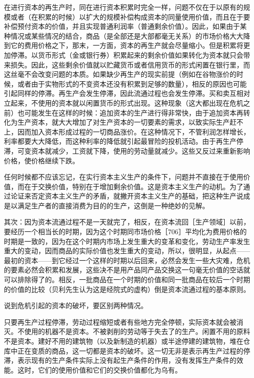 在进行资本的再生产时，同在进行资本积累时完全一样，问题不仅在于以原有的规模或者（在积累的时候）以扩大的规模补偿构成资本的同量使用价值，而且在于要补偿预付资本的价值，并且实现普通利润率（普通剩余价值）。因此，如果由于某种情况或某些情况的结合，商品（是全部还是大部都毫无关系）的市场价格大大降到它的费用价格之下，那末，一方面，资本的再生产就会尽量缩小。但是积累将更加停滞。以货币形式（金或银行券）积累起来的剩余价值如果转化为资本就只会带来损失。因此，这些剩余价值就以贮藏货币或者信用货币的形式闲置在银行里，而这丝毫不会改变问题的本质。如果缺少再生产的现实前提（例如在谷物涨价的时候，或者由于实物形式的不变资本还没有积累到足够的数量），相反的原因也可能引起同样的停滞。再生产会发生停滞，因此流通过程也会发生停滞。买和卖互相对立起来，不使用的资本就以闲置货币的形式出现。这种现象（这大都出现在危机之前）也可能发生在这样的时候：追加资本的生产进行得非常快，由于追加资本再转化为生产资本，就大大增加了对生产资本的一切要素的需求，以致实际生产赶不上，因而加入资本形成过程的一切商品涨价。在这种情况下，不管利润怎样增长，利率都要大大降低，而这种利率的降低就引起最冒险的投机活动。由于再生产停滞，可变资本就减少，工资就下降，使用的劳动量就减少。这些又反过来重新影响价格，使价格继续下跌。

任何时候都不应该忘记，在实行资本主义生产的条件下，问题并不直接在于使用价值，而在于交换价值，特别在于增加剩余价值。这是资本主义生产的动机。为了通过论证来否定资本主义生产的矛盾，就撇开资本主义生产的基础，把这种生产说成是以满足生产者的直接消费为目的的生产，这倒是一种绝妙的见解。

其次：因为资本流通过程不是一天就完了，相反，在资本流回［生产领域］以前，要经历一个相当长的时期，因为这个时期同市场价格［706］平均化为费用价格的时期是一致的，因为在这个时期内市场上发生重大的变革和变化，劳动生产率发生重大的变动，因而商品的实际价值也发生重大的变动，所以，很明显，从起点——最初的资本——到它经过一个这样的时期以后回来，必然会发生一些大灾难，危机的要素必然会积累和发展，这些决不是用产品同产品交换这一句毫无价值的空话就可以排除得了的。相反，一批商品在一个时期的价值和同一批商品在较后一个时期的价值的比较（贝利先生认为这是经院式的虚构）倒是资本流通过程的基本原则。

说到危机引起的资本的破坏，要区别两种情况。

只要再生产过程停滞，劳动过程缩短或者有些地方完全停顿，实际资本就会被消灭。不使用的机器不是资本。不被剥削的劳动等于失去了的生产。闲置不用的原料不是资本。建好不用的建筑物（以及新制造的机器）或半途停建的建筑物，堆在仓库中正在变质的商品，这一切都是资本的破坏。这一切无非是表示再生产过程的停滞，表示现有的生产条件实际上没有起生产条件的作用，没有发挥生产条件的效能。这时，它们的使用价值和它们的交换价值都化为乌有。

